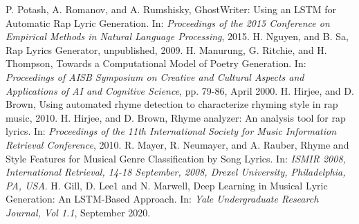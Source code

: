 \documentclass[conference]{IEEEtran}
\begin{document}
\begin{thebibliography}{00}
 P. Potash, A. Romanov, and A. Rumshisky, GhostWriter: Using an LSTM for Automatic Rap Lyric Generation. In: \emph{Proceedings of the 2015 Conference on Empirical Methods in Natural Language Processing}, 2015.
 H. Nguyen, and B. Sa, Rap Lyrics Generator, unpublished, 2009.
 H. Manurung, G. Ritchie, and H. Thompson, Towards a Computational Model of Poetry Generation. In: \emph{Proceedings of AISB Symposium on Creative and Cultural Aspects and Applications of AI and Cognitive Science}, pp. 79-86, April 2000.
 H. Hirjee, and D. Brown, Using automated rhyme detection to characterize rhyming style in rap music, 2010.
 H. Hirjee, and D. Brown, Rhyme analyzer: An analysis tool for rap lyrics. In: \emph{Proceedings of the 11th International Society for Music Information Retrieval Conference}, 2010.
 R. Mayer, R. Neumayer, and A. Rauber, Rhyme and Style Features for Musical Genre Classification by Song Lyrics. In: \emph{ISMIR 2008,  International Retrieval, 14-18 September, 2008, Drexel University, Philadelphia, PA, USA}.
 H. Gill, D. Lee1 and N. Marwell, Deep Learning in Musical Lyric Generation: An LSTM-Based Approach. In: \emph{Yale Undergraduate Research Journal, Vol 1.1}, September 2020.

\end{thebibliography}
\end{document}
